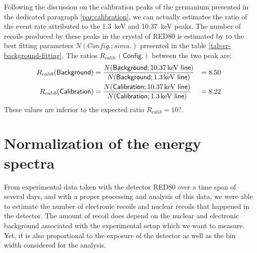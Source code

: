 
Following the discussion on the calibration peaks of the germanium presented in the dedicated paragraph \ref{par:calibration}, we can actually estimates the ratio of the event rate attributed to the \SI{1.3}{\kilo\eV} and \SI{10.37}{\kilo\eV} peaks. The number of recoils produced by these peaks in the crystal of RED80 is estimated by to the best fitting parameters $N(Config.; simu.)$ presented in the table \ref{tab:er-background-fitting}. The ratios $R_{calib.}(\textsf{Config.})$ between the two peak are:
\begin{align}
R_{calib} (\textsf{Background}) 
&=
\frac{
N(\textsf{Background}; \textsf{\SI{10.37}{\kilo\eV} line})
}{
N(\textsf{Background}; \textsf{\SI{1.3}{\kilo\eV} line})
}
&= 8.50
\\
R_{calib} (\textsf{Calibration}) 
&=
\frac{
N(\textsf{Calibration}; \textsf{\SI{10.37}{\kilo\eV} line})
}{
N(\textsf{Calibration}; \textsf{\SI{1.3}{\kilo\eV} line})
}
&= 8.22
\end{align}
These values are inferior to the expected ratio $R_{calib}=10?$.


\section{Normalization of the energy spectra}

From experimental data taken with the detector RED80 over a time span of several days, and with a proper processing and analysis of this data, we were able to estimate the number of electronic recoils and nuclear recoils that happened in the detector.
The amount of recoil does depend on the nuclear and electronic background associated with the experimental setup which we want to measure. Yet, it is also proportional to the exposure of the detector as well as the bin width considered for the analysis.


